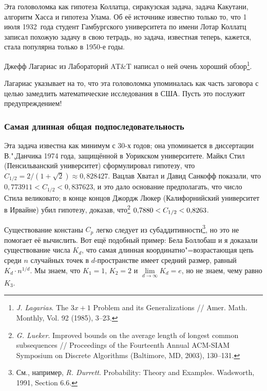 \documentclass[twoside]{book}
\begin{document}
\subsubsection*{}

Эта головоломка  как гипотеза Коллатца, сиракузская задача, задача Какутани, алгоритм Хасса и гипотеза Улама.
Об её источнике известно только то, что 1 июля 1932~года студент Гамбургского университета по имени Лотар Коллатц записал похожую задачу в свою тетрадь, но задача, известная теперь, кажется, стала популярна только в 1950-е годы.

Джефф Лагариас из Лабораторий AT\&T написал о ней очень хороший
обзор\footnote{\emph{J. Lagarias}. The $3x+1$ Problem and its Generalizations /\!/ {Amer. Math. Monthly}, Vol. 92 (1985), 3--23.%
}.

Лагариас указывает на то, что эта головоломка упоминалась как часть заговора с целью замедлить математические исследования в США.
Пусть это послужит предупреждением!

\subsubsection*{Самая длинная общая подпоследовательность}

Эта задача известна как минимум с 30-х годов;
она упоминается в диссертации В.",Данчика 1974 года, защищённой в Уорикском университете.
\mbox{Майкл} Стил (Пенсильванский университет) сформулировал гипотезу, что $C_{1/2} = 2/(1+\sqrt{2})\approx 0{,}828427$.
Вацлав Хватал и Давид Санкофф показали, что $0{,}773911 < C_{1/2} < 0{,}837623$, и это дало основание предполагать, что число Стила великовато;
в конце концов Джордж Люкер (Калифорнийский университет в Ирвайне) убил гипотезу, доказав, что\footnote{
\emph{G. Lueker}. 
Improved bounds on the average length of longest common subsequences /\!/ {Proceedings of the Fourteenth Annual ACM-SIAM Symposium on Discrete Algorithms} (Baltimore, MD, 2003), 130–131.}
$0{,}7880 \z< C_{1/2} \z< 0{,}8263$.

Существование констаны $C_p$ легко следует из субаддитивности\footnote{См., например, \emph{R. Durrett}. {Probability: Theory and Examples}. Wadsworth, 1991, Section 6.6.}, но это не помогает её вычислить.
Вот ещё подобный пример: Бела Боллобаш и я доказали существование  числа $K_d$, что самая длинная координатно"=возрастающая цепь среди $n$ случайных точек в $d$-пространстве имеет средний размер, равный $K_d\cdot n^{1/d}$.
Мы знаем, что $K_1=1$, $K_2=2$ и $\lim\limits_{d\to\infty} K_d=e$, но не знаем, чему равно $K_3$.
\end{document}
